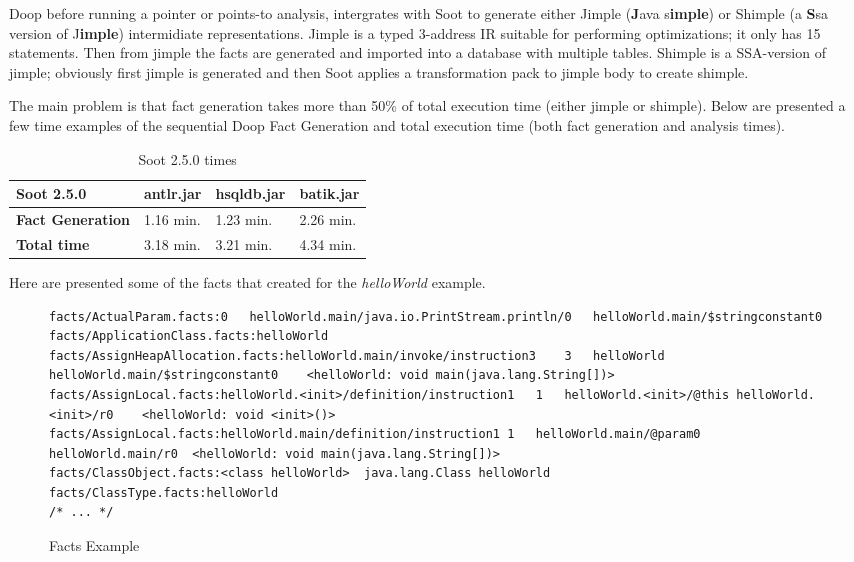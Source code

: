 \documentclass{dithesis}
\begin{document}
        Doop before running a pointer or points-to analysis, intergrates with Soot to generate either Jimple (\textbf{J}ava s\textbf{imple}) or Shimple (a \textbf{S}sa version of J\textbf{imple}) intermidiate representations. Jimple is a typed 3-address IR suitable for performing optimizations; it only has 15 statements. Then from jimple the facts are generated and imported into a database with multiple tables. Shimple is a SSA-version of jimple; obviously first jimple is generated and then Soot applies a transformation pack to jimple body to create shimple. 

        The main problem is that fact generation takes more than 50\% of total execution time (either jimple or shimple). Below are presented a few time examples of the sequential Doop Fact Generation and total execution time (both fact generation and analysis times). 

        \begin{table}[H]
            \centering
            \label{my-label}
\begin{tabular}{llll}
\hline
\textbf{Soot 2.5.0}      & \textbf{antlr.jar} & \textbf{hsqldb.jar} & \textbf{batik.jar} \\ \hline
\textbf{Fact Generation} & 1.16 min.          & 1.23 min.           & 2.26 min.          \\
\textbf{Total time}      & 3.18 min.          & 3.21 min.           & 4.34 min.          \\ \hline
\end{tabular}
            \caption{Soot 2.5.0 times}
        \end{table}

    	Here are presented some of the facts that created for the \textit{helloWorld} example. 
    	\begin{figure}[H]
\begin{lstlisting}
facts/ActualParam.facts:0	helloWorld.main/java.io.PrintStream.println/0	helloWorld.main/$stringconstant0
facts/ApplicationClass.facts:helloWorld
facts/AssignHeapAllocation.facts:helloWorld.main/invoke/instruction3	3	helloWorld	helloWorld.main/$stringconstant0	<helloWorld: void main(java.lang.String[])>
facts/AssignLocal.facts:helloWorld.<init>/definition/instruction1	1	helloWorld.<init>/@this	helloWorld.<init>/r0	<helloWorld: void <init>()>
facts/AssignLocal.facts:helloWorld.main/definition/instruction1	1	helloWorld.main/@param0	helloWorld.main/r0	<helloWorld: void main(java.lang.String[])>
facts/ClassObject.facts:<class helloWorld>	java.lang.Class	helloWorld
facts/ClassType.facts:helloWorld
/* ... */
\end{lstlisting}
        \caption{Facts Example}
        \end{figure}
    	
\end{document}
